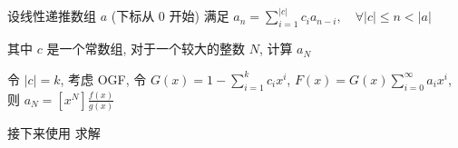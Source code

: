 设线性递推数组 \(a\) (下标从 \(0\) 开始) 满足 \(\displaystyle a_n=\sum_{i=1}^{|c|} c_i a_{n-i},\quad \forall |c|\leq n < |a|\)

其中 \(c\) 是一个常数组, 对于一个较大的整数 \(N\), 计算 \(a_N\)

令 \(|c|=k\), 考虑 OGF, 令 \(\displaystyle G(x)=1-\sum_{i=1}^k c_ix^i\), \(\displaystyle F(x)=G(x)\sum_{i=0}^{\infty} a_ix^i\), 则 \(\displaystyle a_N=\left[x^N\right]\frac{f(x)}{g(x)}\)

接下来使用  求解
